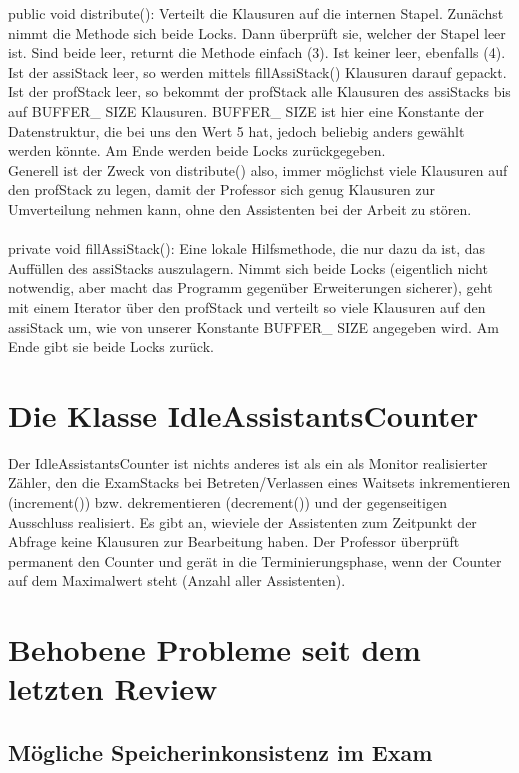 \documentclass[12pt,a4paper]{article}
\begin{document}
public void distribute(): Verteilt die Klausuren auf die internen Stapel. Zunächst nimmt die Methode sich beide Locks. Dann überprüft sie, welcher der Stapel leer ist. Sind beide leer, returnt die Methode einfach (3). Ist keiner leer, ebenfalls (4). Ist der assiStack leer, so werden mittels fillAssiStack() Klausuren darauf gepackt. Ist der profStack leer, so bekommt der profStack alle Klausuren des assiStacks bis auf BUFFER\_
SIZE Klausuren. BUFFER\_
SIZE ist hier eine Konstante der Datenstruktur, die bei uns den Wert 5 hat, jedoch beliebig anders gewählt werden könnte. Am Ende werden beide Locks zurückgegeben.\\
Generell ist der Zweck von distribute() also, immer möglichst viele Klausuren auf den profStack zu legen, damit der Professor sich genug Klausuren zur Umverteilung nehmen kann, ohne den Assistenten bei der Arbeit zu stören.
\\
\\
private void fillAssiStack(): Eine lokale Hilfsmethode, die nur dazu da ist, das Auffüllen des assiStacks auszulagern. Nimmt sich beide Locks (eigentlich nicht notwendig, aber macht das Programm gegenüber Erweiterungen sicherer), geht mit einem Iterator über den profStack und verteilt so viele Klausuren auf den assiStack um, wie von unserer Konstante BUFFER\_
SIZE angegeben wird. Am Ende gibt sie beide Locks zurück.

\newpage
\section{Die Klasse IdleAssistantsCounter}

Der IdleAssistantsCounter ist nichts anderes ist als ein als Monitor realisierter Zähler, den die ExamStacks bei Betreten/Verlassen eines Waitsets inkrementieren (increment()) bzw. dekrementieren (decrement()) und der gegenseitigen Ausschluss realisiert. Es gibt an, wieviele der Assistenten zum Zeitpunkt der Abfrage keine Klausuren zur Bearbeitung haben. Der Professor überprüft permanent den Counter und gerät in die Terminierungsphase, wenn der Counter auf dem Maximalwert steht (Anzahl aller Assistenten). 

\newpage
\section{Behobene Probleme seit dem letzten Review}
\subsection{Mögliche Speicherinkonsistenz im Exam}
\end{document}
